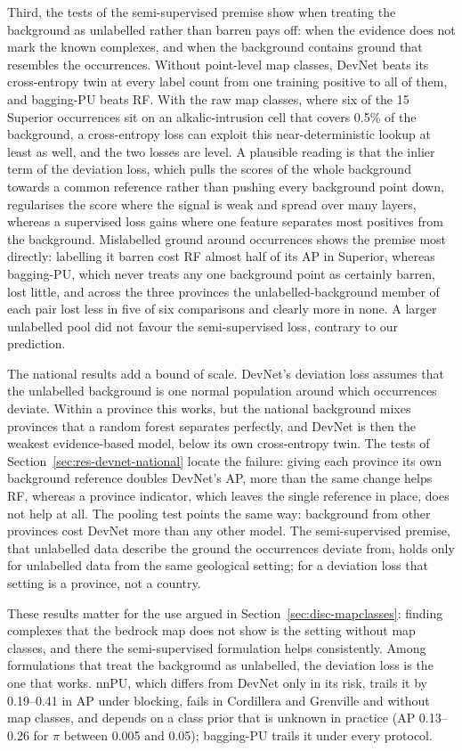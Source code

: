 \documentclass[pdflatex,sn-apa]{sn-jnl}
\begin{document}
Third, the tests of the semi-supervised premise show when treating the background as unlabelled rather than barren pays off: when the evidence does not mark the known complexes, and when the background contains ground that resembles the occurrences. Without point-level map classes, DevNet beats its cross-entropy twin at every label count from one training positive to all of them, and bagging-PU beats RF. With the raw map classes, where six of the 15 Superior occurrences sit on an alkalic-intrusion cell that covers 0.5\% of the background, a cross-entropy loss can exploit this near-deterministic lookup at least as well, and the two losses are level. A plausible reading is that the inlier term of the deviation loss, which pulls the scores of the whole background towards a common reference rather than pushing every background point down, regularises the score where the signal is weak and spread over many layers, whereas a supervised loss gains where one feature separates most positives from the background. Mislabelled ground around occurrences shows the premise most directly: labelling it barren cost RF almost half of its AP in Superior, whereas bagging-PU, which never treats any one background point as certainly barren, lost little, and across the three provinces the unlabelled-background member of each pair lost less in five of six comparisons and clearly more in none. A larger unlabelled pool did not favour the semi-supervised loss, contrary to our prediction.

The national results add a bound of scale. DevNet's deviation loss assumes that the unlabelled background is one normal population around which occurrences deviate. Within a province this works, but the national background mixes provinces that a random forest separates perfectly, and DevNet is then the weakest evidence-based model, below its own cross-entropy twin. The tests of Section~\ref{sec:res-devnet-national} locate the failure: giving each province its own background reference doubles DevNet's AP, more than the same change helps RF, whereas a province indicator, which leaves the single reference in place, does not help at all. The pooling test points the same way: background from other provinces cost DevNet more than any other model. The semi-supervised premise, that unlabelled data describe the ground the occurrences deviate from, holds only for unlabelled data from the same geological setting; for a deviation loss that setting is a province, not a country.

These results matter for the use argued in Section~\ref{sec:disc-mapclasses}: finding complexes that the bedrock map does not show is the setting without map classes, and there the semi-supervised formulation helps consistently. Among formulations that treat the background as unlabelled, the deviation loss is the one that works. nnPU, which differs from DevNet only in its risk, trails it by 0.19--0.41 in AP under blocking, fails in Cordillera and Grenville and without map classes, and depends on a class prior that is unknown in practice (AP 0.13--0.26 for $\pi$ between 0.005 and 0.05); bagging-PU trails it under every protocol.
\end{document}
